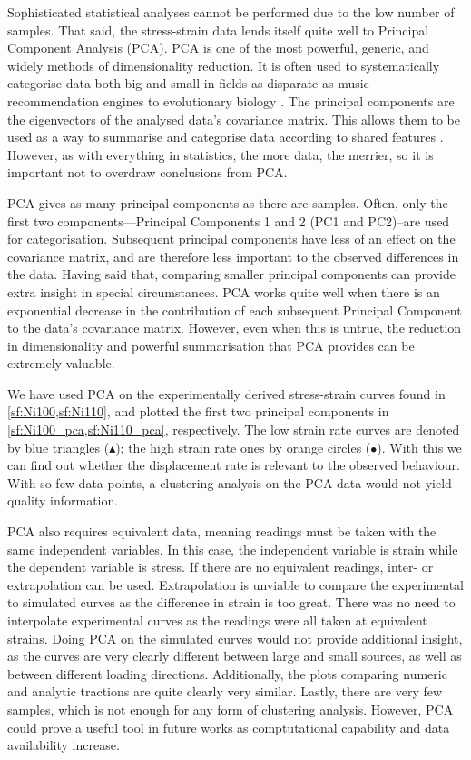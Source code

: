 Sophisticated statistical analyses cannot be performed due to the low number of samples. That said, the stress-strain data lends itself quite well to Principal Component Analysis (PCA). PCA is one of the most powerful, generic, and widely methods of dimensionality reduction. It is often used to systematically categorise data both big and small in fields as disparate as music recommendation engines to evolutionary biology \cite{pcamusic,pcaBio}. The principal components are the eigenvectors of the analysed data's covariance matrix. This allows them to be used as a way to summarise and categorise data according to shared features \cite{pca1}. However, as with everything in statistics, the more data, the merrier, so it is important not to overdraw conclusions from PCA.

PCA gives as many principal components as there are samples. Often, only the first two components---Principal Components 1 and 2 (PC1 and PC2)--are used for categorisation. Subsequent principal components have less of an effect on the covariance matrix, and are therefore less important to the observed differences in the data. Having said that, comparing smaller principal components can provide extra insight in special circumstances. PCA works quite well when there is an exponential decrease in the contribution of each subsequent Principal Component to the data's covariance matrix. However, even when this is untrue, the reduction in dimensionality and powerful summarisation that PCA provides can be extremely valuable.

We have used PCA on the experimentally derived stress-strain curves found in \cref{sf:Ni100,sf:Ni110}, and plotted the first two principal components in \cref{sf:Ni100_pca,sf:Ni110_pca}, respectively. The low strain rate curves are denoted by blue triangles (\textcolor{matlabBlue}{$\blacktriangle$}); the high strain rate ones by orange circles (\textcolor{matlabOrange}{$\bullet$}). With this we can find out whether the displacement rate is relevant to the observed behaviour. With so few data points, a clustering analysis on the PCA data would not yield quality information.

PCA also requires equivalent data, meaning readings must be taken with the same independent variables. In this case, the independent variable is strain while the dependent variable is stress. If there are no equivalent readings, inter- or extrapolation can be used. Extrapolation is unviable to compare the experimental to simulated curves as the difference in strain is too great. There was no need to interpolate experimental curves as the readings were all taken at equivalent strains. Doing PCA on the simulated curves would not provide additional insight, as the curves are very clearly different between large and small sources, as well as between different loading directions. Additionally, the plots comparing numeric and analytic tractions are quite clearly very similar. Lastly, there are very few samples, which is not enough for any form of clustering analysis. However, PCA could prove a useful tool in future works as comptutational capability and data availability increase.

